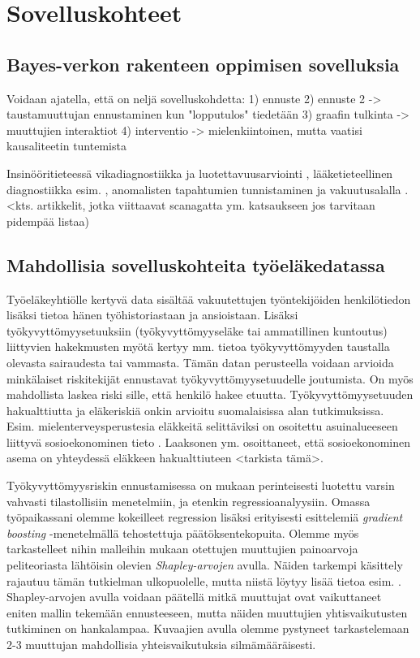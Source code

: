 \chapter{Sovelluskohteet\label{applications}}
\section{Bayes-verkon rakenteen oppimisen sovelluksia}
Voidaan ajatella, että on neljä sovelluskohdetta:
1) ennuste
2) ennuste 2 -> taustamuuttujan ennustaminen kun "lopputulos" tiedetään
3) graafin tulkinta -> muuttujien interaktiot
4) interventio -> mielenkiintoinen, mutta vaatisi kausaliteetin tuntemista


Insinööritieteessä vikadiagnostiikka ja luotettavuusarviointi \citep{zhang_brief_2019}, lääketieteellinen diagnostiikka esim. \citep{mittal_review_2011}, anomalisten tapahtumien tunnistaminen \citep{kaur_review_2013} ja vakuutusalalla \citep{ramsahai_connecting_2020}. <kts. artikkelit, jotka viittaavat scanagatta ym. katsaukseen jos tarvitaan pidempää listaa)

\section{Mahdollisia sovelluskohteita työeläkedatassa}
Työeläkeyhtiölle kertyvä data sisältää vakuutettujen työntekijöiden henkilötiedon lisäksi tietoa hänen työhistoriastaan ja ansioistaan. Lisäksi työkyvyttömyysetuuksiin (työkyvyttömyyseläke tai ammatillinen kuntoutus) liittyvien hakekmusten myötä kertyy mm. tietoa työkyvyttömyyden taustalla olevasta sairaudesta tai vammasta. Tämän datan perusteella voidaan arvioida minkälaiset riskitekijät ennustavat työkyvyttömyysetuudelle joutumista. On myös mahdollista laskea riski sille, että henkilö hakee etuutta. Työkyvyttömyysetuuden hakualttiutta ja eläkeriskiä onkin arvioitu suomalaisissa alan tutkimuksissa. Esim. mielenterveysperustesia eläkkeitä selittäviksi on osoitettu asuinalueeseen liittyvä sosioekonominen tieto \citep{karolaakso_contextual_2021, karolaakso_socioeconomic_2020}. Laaksonen ym. osoittaneet, että sosioekonominen asema on yhteydessä eläkkeen hakualttiuteen <tarkista tämä>.

Työkyvyttömyysriskin ennustamisessa on \citet{gross_machine_2020} mukaan perinteisesti luotettu varsin vahvasti tilastollisiin menetelmiin, ja etenkin regressioanalyysiin. Omassa työpaikassani olemme kokeilleet regression lisäksi erityisesti \citet{friedman_greedy_2001} esittelemiä \emph{gradient boosting} -menetelmällä tehostettuja päätöksentekopuita. Olemme myös tarkastelleet nihin malleihin mukaan otettujen muuttujien painoarvoja peliteoriasta lähtöisin olevien \emph{Shapley-arvojen} avulla. Näiden tarkempi käsittely rajautuu tämän tutkielman ulkopuolelle, mutta niistä löytyy lisää tietoa esim. \citet{merrick_explanation_2020}. Shapley-arvojen avulla voidaan päätellä mitkä muuttujat ovat vaikuttaneet eniten mallin tekemään ennusteeseen, mutta näiden muuttujien yhtisvaikutusten tutkiminen on hankalampaa. Kuvaajien avulla olemme pystyneet tarkastelemaan 2-3 muuttujan mahdollisia yhteisvaikutuksia silmämääräisesti.

